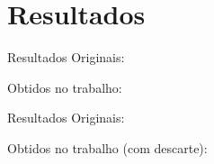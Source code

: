 
\section{Resultados}

\begin{frame}{Resultados}
    Originais:
    \begin{small}
        
    \end{small}
    \vskip10pt
    Obtidos no trabalho:
    \begin{small}
        
    \end{small}
\end{frame}

\begin{frame}{Resultados}
    Originais:
    \begin{small}
        
    \end{small}
    \vskip10pt
    Obtidos no trabalho (com descarte):
    \begin{small}
        
    \end{small}
\end{frame}
